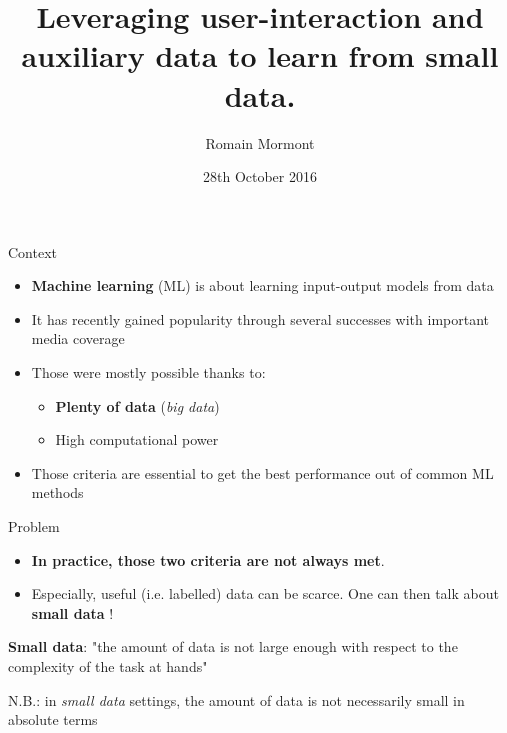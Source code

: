 \documentclass{beamer}
\title{{\bf Leveraging user-interaction and auxiliary data to learn from small data.}}
\author{Romain Mormont}
\institute{Systems and modeling unit, \\
Department of EE \& CS, \\ University of Liège, Belgium}
\date{28th October 2016}
\begin{document}
\renewcommand{\inserttotalframenumber}{12}


\begin{frame}
\titlepage
\end{frame}


\begin{frame}{Context}
	\begin{itemize}
		\item \textbf{Machine learning} (ML) is about learning input-output models from data 
		\item It has recently gained popularity through several successes with important media coverage
		\item Those were mostly possible thanks to: 
		\begin{itemize}
			\item \textbf{Plenty of data} (\textit{big data})
			\item High computational power
		\end{itemize}
		\item Those criteria are essential to get the best performance out of common ML methods
	\end{itemize}
\end{frame}

\begin{frame}{Problem}
	\begin{itemize}
		\item \textbf{In practice, those two criteria are not always met}.
		\item Especially, useful (i.e. labelled) data can be scarce. One can then talk about \textbf{small data} ! 
	\end{itemize}
	\vfill
	\begin{center}
		\large
		\textbf{Small data}: "the amount of data is not large enough with respect to the complexity of the task at hands" 
	\end{center}
	\vfill
	\begin{center}
		\small
		N.B.: in \textit{small data} settings, the amount of data is not necessarily small in absolute terms 
	\end{center}
\end{frame}
\end{document}
